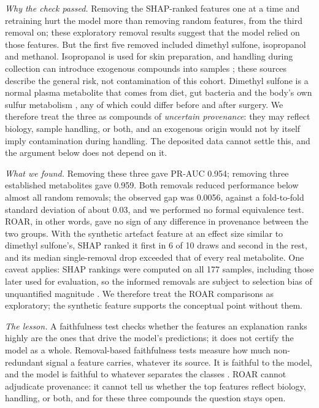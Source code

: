 \documentclass[conference]{IEEEtran}
\begin{document}
\emph{Why the check passed.} Removing the SHAP-ranked features one at a time
and retraining hurt the model more than removing random features, from the
third removal on; these exploratory removal results suggest that the model
relied on those features. But the first five removed included dimethyl
sulfone, isopropanol and methanol. Isopropanol is used for skin preparation,
and handling during collection can introduce exogenous compounds into
samples \cite{bernini2011, vandersar2015}; these sources describe the
general risk, not contamination of this cohort. Dimethyl sulfone is a normal
plasma metabolite that comes from diet, gut bacteria and the body's own
sulfur metabolism \cite{engelke2005}, any of which could differ before and
after surgery. We therefore treat the three as compounds of \emph{uncertain
provenance}: they may reflect biology, sample handling, or both, and an
exogenous origin would not by itself imply contamination during handling.
The deposited data cannot settle this, and the argument below does not
depend on it.

\emph{What we found.} Removing these three gave PR-AUC 0.954; removing three
established metabolites gave 0.959. Both removals reduced performance below
almost all random removals; the observed gap was 0.0056, against a
fold-to-fold standard deviation of about 0.03, and we performed no formal
equivalence test. ROAR, in other words, gave no sign of any difference in
provenance between the two groups. With the synthetic artefact feature at an
effect size similar to dimethyl sulfone's, SHAP ranked it first in 6 of 10
draws and second in the rest, and its median single-removal drop exceeded
that of every real metabolite. One caveat applies: SHAP rankings were
computed on all 177 samples, including those later used for evaluation, so
the informed removals are subject to selection bias of unquantified
magnitude \cite{varma2006}. We therefore treat the ROAR comparisons as
exploratory; the synthetic feature supports the conceptual point without
them.

\emph{The lesson.} A faithfulness test checks whether the features an
explanation ranks highly are the ones that drive the model's predictions; it
does not certify the model as a whole. Removal-based faithfulness tests
measure how much non-redundant signal a feature carries, whatever its
source. It is faithful to the model, and the
model is faithful to whatever separates the classes
\cite{adebayo2018, kumar2020}. ROAR cannot adjudicate provenance: it cannot
tell us whether the top features reflect biology, handling, or both, and for
these three compounds the question stays open.
\end{document}
